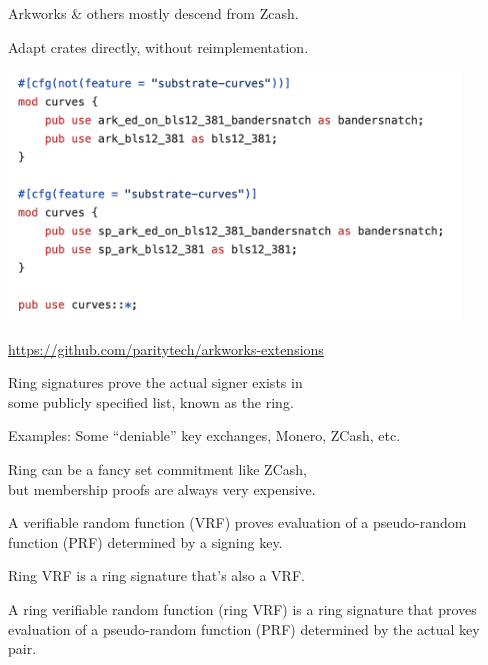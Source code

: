 \documentclass{beamer}
\begin{document}
\begin{frame}

Arkworks \& others mostly descend from Zcash. \\ \smallskip

Adapt crates directly, without reimplementation.

\smallskip

\includegraphics[width=0.9\textwidth]{../images/use_curves.png}

\url{https://github.com/paritytech/arkworks-extensions}

\end{frame}






\begin{frame}
	
Ring signatures prove the actual signer exists in \\
\hspace{10pt} some publicly specified list, known as the ring.

\bigskip\bigskip

Examples:  Some ``deniable'' key exchanges, Monero, ZCash, etc.

\bigskip\bigskip

Ring can be a fancy set commitment like ZCash, \\
\hspace{10pt} but membership proofs are always very expensive.
	
\end{frame}


\begin{frame}

A verifiable random function (VRF) proves evaluation of a pseudo-random function (PRF) determined by a signing key.

\bigskip\bigskip
Ring VRF is a ring signature that's also a VRF.

\bigskip %

A ring verifiable random function (ring VRF) is a ring signature that proves evaluation of a pseudo-random function (PRF) determined by the actual key pair.

\end{frame}
\end{document}
